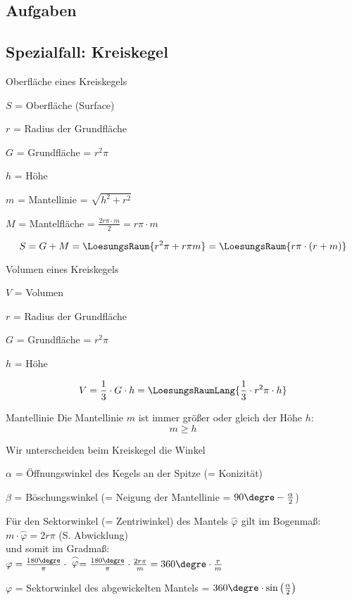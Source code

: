 \subsection*{Aufgaben}
\newpage

\subsection{Spezialfall: Kreiskegel}


\begin{gesetz}{Oberfläche eines Kreiskegels}{}

  $S$ = Oberfläche (Surface)

  $r$ = Radius der Grundfläche
  
  $G$ = Grundfläche = $r^2\pi$

  $h$ = Höhe

  $m$ = Mantellinie = $\sqrt{h^2 + r^2}$
  
  $M$ = Mantelfläche = $\frac{2r\pi \cdot{} m}2 = r\pi\cdot{}m$

  
  $$S = G + M = \LoesungsRaum{r^2\pi + r\pi m} = \LoesungsRaum{r\pi\cdot{}(r+m)}$$
\end{gesetz}


\begin{gesetz}{Volumen eines Kreiskegels}{}

  $V$ = Volumen

  $r$ = Radius der Grundfläche
  
  $G$ = Grundfläche = $r^2\pi$

  $h$ = Höhe

  $$V = \frac13\cdot{} G\cdot{}h = \LoesungsRaumLang{\frac13 \cdot{} r^2\pi \cdot{} h}$$
\end{gesetz}


\begin{bemerkung}{Mantellinie}{}
  Die Mantellinie $m$ ist immer größer oder gleich der Höhe $h$:
  $$m \ge{} h$$
\end{bemerkung}

\newpage


\begin{bemerkung}{}{}
  Wir unterscheiden beim Kreiskegel die Winkel

  $\alpha$ = Öffnungswinkel des Kegels an der Spitze (= Konizität)

  $\beta$ = Böschungswinkel (= Neigung der Mantellinie = $90\degre - \frac{\alpha}{2}$)

  Für den Sektorwinkel (= Zentriwinkel) des Mantels $\stackrel{\frown}{\varphi}$ gilt im Bogenmaß: $m\cdot\stackrel{\frown}{\varphi} = 2r\pi$ (S. Abwicklung)\\
  und somit im Gradmaß:\\ $\varphi = \frac{180\degre}\pi \cdot{} \stackrel{\frown}{\varphi} = \frac{180\degre}\pi \cdot \frac{2r\pi}m = 360\degre\cdot{}\frac{r}m$ 
  
  $\varphi$ = Sektorwinkel des abgewickelten Mantels = $360\degre \cdot \sin\left(\frac{\alpha}2\right)$

\end{bemerkung}

